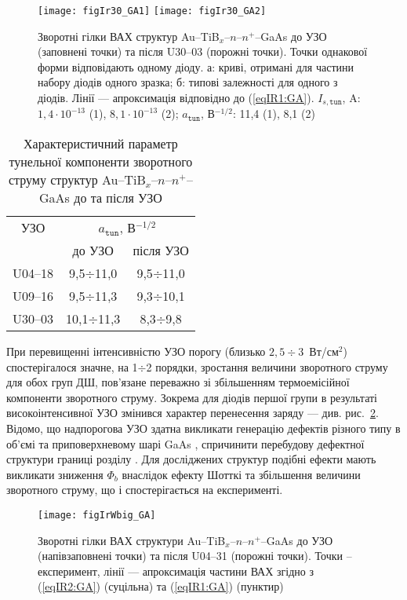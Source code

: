 \begin{figure}
\center
\texttt{[image: figIr30\_GA1]} \hfill
\texttt{[image: figIr30\_GA2]}
\caption{\label{figIr30_GA}
Зворотні гілки ВАХ структур Au--TiB$_x$--$n$--$n^+$--GaAs
до УЗО (заповнені точки)
та після U30--03 (порожні точки).
Точки однакової форми відповідають одному діоду.
а: криві, отримані для частини набору діодів одного зразка;
б: типові залежності для одного з діодів.
Лінії --- апроксимація відповідно до (\ref{eqIR1:GA}).
$I_{s,\mathtt{tun}}$, A: $1,4\cdot10^{-13}$ (1), $8,1\cdot10^{-13}$ (2);
$a_\mathtt{tun}$, В$^{-1/2}$: 11,4 (1), 8,1 (2)
}%
\end{figure}

\begin{table}
\caption{\label{tabUS_GaAs}Характеристичний параметр тунельної компоненти
зворотного струму структур Au--TiB$_x$--$n$--$n^+$--GaAs до та після УЗО
}
\center
\begin{tabular}{|c|c|c|}
\hline
УЗО&\multicolumn{2}{c|}{$a_\mathtt{tun}$, В$^{-1/2}$}\\ \cline{2-3}
& до УЗО & після УЗО \\
\hline
U04--18&9,5$\div$11,0&9,5$\div$11,0\\ \hline
U09--16&9,5$\div$11,3&9,3$\div$10,1\\ \hline
U30--03&10,1$\div$11,3&8,3$\div$9,8\\ \hline
\end{tabular}
\end{table}


При перевищенні інтенсивністю  УЗО порогу (близько $2,5\div3$~Вт/см$^2$) спостерігалося значне, на 1$\div$2 порядки,
зростання величини зворотного струму для обох груп ДШ, пов'язане переважно зі збільшенням термоемісійної компоненти зворотного струму.
Зокрема для діодів першої групи в результаті високоінтенсивної УЗО
змінився характер перенесення заряду --- див. рис.~\ref{figIrWbig_GA}.
Відомо, що надпорогова УЗО здатна викликати генерацію дефектів різного типу в об’ємі та приповерхневому шарі GaAs \cite{Zaver},
спричинити перебудову дефектної структури границі розділу \cite{Parchinskii2003r}.
Для досліджених структур подібні ефекти мають викликати зниження $\Phi_b$ внаслідок ефекту Шотткі та збільшення величини зворотного струму, що і спостерігається на експерименті.


\begin{figure}
\center
\texttt{[image: figIrWbig\_GA]}%
\caption{\label{figIrWbig_GA}
Зворотні гілки ВАХ структури Au--TiB$_x$--$n$--$n^+$--GaAs
до УЗО (напівзаповнені точки)
та після U04--31 (порожні точки).
Точки -- експеримент,
лінії --- апроксимація частини ВАХ згідно з (\ref{eqIR2:GA}) (суцільна) та (\ref{eqIR1:GA}) (пунктир)
}%
\end{figure}




